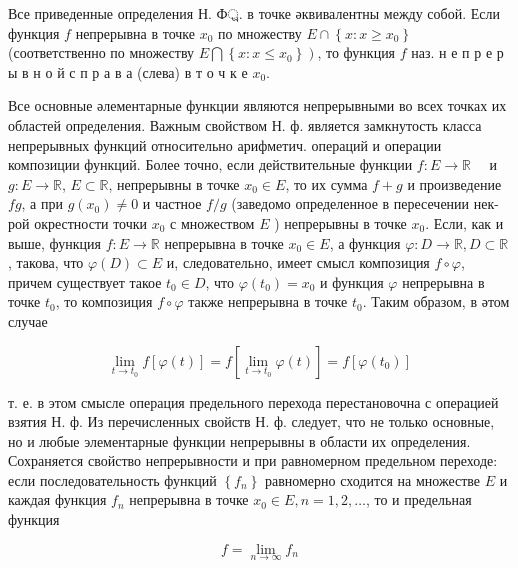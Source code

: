 \documentclass[10pt]{article}
\begin{document}
Все приведенные определения Н. Ф্র. в точке әквивалентны между собой. Если функция $f$ непрерывна в точке $x_{0}$ по множеству $E \cap\left\{x: x \geqslant x_{0}\right\}$ (соответственно по множеству $\left.E \bigcap\left\{x: x \leqslant x_{0}\right\}\right)$, то функция $f$ наз. н е п р е р ы в н о й с п р а в а (слева) в т о ч к е $x_{0}$.



Все основные әлементарные функции являются непрерывными во всех точках их областей определения. Важным свойством Н. ф. является замкнутость класса непрерывных функций относительно арифметич. операций и операции композиции функций. Более точно, если действительные функции $f: E \rightarrow \mathbb{R} \quad$ и $g: E \rightarrow \mathbb{R}$, $E \subset \mathbb{R}$, непрерывны в точке $x_{0} \in E$, то их сумма $f+g$ и произведение $f g$, а при $g\left(x_{0}\right) \neq 0$ и частное $f / g$ (заведомо определенное в пересечении нек-рой окрестности точки $x_{0}$ с множеством $E$ ) непрерывны в точке $x_{0}$. Если, как и выше, функция $f: E \rightarrow \mathbb{R}$ непрерывна в точке $x_{0} \in E$, а функция $\varphi: D \rightarrow \mathbb{R}, D \subset \mathbb{R}$, такова, что $\varphi(D) \subset E$ и, следовательно, имеет смысл композиция $f \circ \varphi$, причем существует такое $t_{0} \in D$, что $\varphi\left(t_{0}\right)=x_{0}$ и функция $\varphi$ непрерывна в точке $t_{0}$, то композиция $f \circ \varphi$ также непрерывна в точке $t_{0}$. Таким образом, в әтом случае



\[

\lim _{t \rightarrow t_{0}} f[\varphi(t)]=f\left[\lim _{t \rightarrow t_{0}} \varphi(t)\right]=f\left[\varphi\left(t_{0}\right)\right]

\]



т. е. в этом смысле операция предельного перехода перестановочна с операцией взятия Н. ф. Из перечисленных свойств Н. ф. следует, что не только основные, но и любые элементарные функции непрерывны в области их определения. Сохраняется свойство непрерывности и при равномерном предельном переходе: если последовательность функций $\left\{f_{n}\right\}$ равномерно сходится на множестве $E$ и каждая функция $f_{n}$ непрерывна в точке $x_{0} \in E, n=1,2, \ldots$, то и предельная функция



\[

f=\lim _{n \rightarrow \infty} f_{n}

\]
\end{document}
